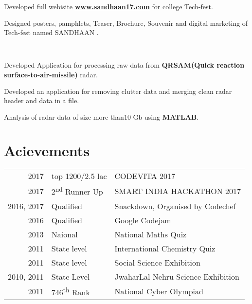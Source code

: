 \documentclass[a4paper]{manish-resume} %
\begin{document}
\begin{minipage}[t]{0.66\textwidth}
\begin{tightitemize}
\item Developed full webisite \href{http://www.sandhaan17.com} {\bf www.sandhaan17.com}  for college Tech-fest.
\item Designed posters, pamphlets, Teaser, Brochure, Souvenir and digital marketing of Tech-fest named SANDHAAN .
\end{tightitemize}
\sectionspace
 \\

\begin{tightitemize}
\item Developed Application for processing  raw data from \textbf{ QRSAM(Quick reaction surface-to-air-missile)} radar.
\item Developed an application for removing clutter data and merging clean radar header and data in a file.
\item Analysis of radar data of size more than10 Gb using \textbf{MATLAB}.
\end{tightitemize}


\sectionspace %


\section{Acievements} 

\begin{tabular}{rll}
2017	 & top 1200/2.5 lac & CODEVITA 2017 \\
2017	 & 2\textsuperscript{nd} Runner Up &  SMART INDIA HACKATHON 2017\\
2016, 2017	 & Qualified & Snackdown, Organised by Codechef\\
2016	 & Qualified & Google Codejam\\
2013 & Naional & National Maths Quiz\\
2011 & State level& International Chemistry Quiz\\
2011 & State level & Social Science Exhibition \\
2010, 2011 & State Level & JwaharLal Nehru Science Exhibition\\
2011 & 746\textsuperscript{th} Rank & National Cyber Olympiad\\
\end{tabular}


\end{minipage}
\end{document}
